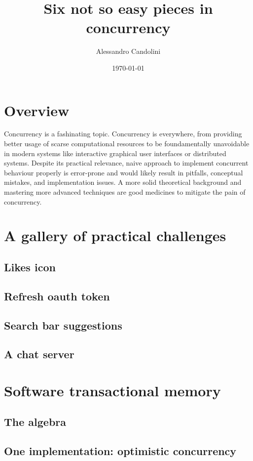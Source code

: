 \documentclass[onecolumn,a4paper,11pt]{article}
\title{Six not so easy pieces in concurrency}
\author{Alessandro Candolini}
\affiliation{Fill.me}
\date{\today}
\begin{document}
\maketitle

\section{Overview}
\label{sec:overview}
Concurrency is a fashinating topic. 
Concurrency is everywhere, from providing better usage of scarse computational resources to be foundamentally unavoidable in modern systems like interactive graphical user interfaces or distributed systems. 
Despite its practical relevance, naive approach to implement concurrent behaviour properly is error-prone and would likely result in pitfalls, conceptual mistakes, and implementation issues. 
A more solid theoretical background and mastering more advanced techniques are good medicines to mitigate the pain of concurrency. 

\section{A gallery of practical challenges}
\subsection{Likes icon}
\subsection{Refresh oauth token}
\subsection{Search bar suggestions} 
\subsection{A chat server}


\section{Software transactional memory}

\subsection{The algebra}
\subsection{One implementation: optimistic concurrency}
\end{document}
